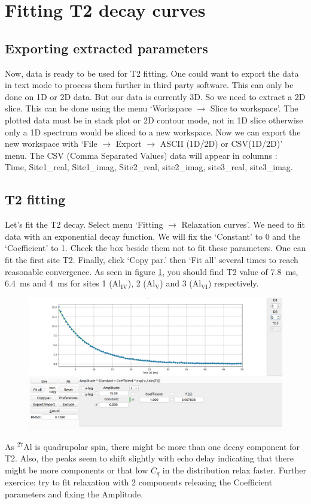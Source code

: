\documentclass[11pt,a4paper]{article}
\begin{document}
\section{Fitting T2 decay curves }
\subsection{Exporting extracted parameters}
Now, data is ready to be used for T2 fitting. One could want to export the data in text mode to process them further in third party software.
This can only be done on 1D or 2D data. But our data is currently 3D. So we need to extract a 2D slice. This can be done using the menu 
`Workspace  $\rightarrow$ Slice to workspace'. The plotted data must be in stack plot or 2D contour mode, not in 1D slice 
otherwise only a 1D spectrum would be sliced to a new workspace. Now we can export the new workspace with 
`File $\rightarrow$ Export $\rightarrow$ ASCII (1D/2D) or CSV(1D/2D)' menu. The CSV (Comma Separated Values) data will appear in columns :\\
Time, Site1\_real, Site1\_imag, Site2\_real, site2\_imag, site3\_real, site3\_imag.

\subsection{T2 fitting}
Let's fit the T2 decay. Select menu `Fitting $\rightarrow$ Relaxation curves'.
We need to fit data with an exponential decay function. We will fix the `Constant' to 0  and the `Coefficient' to 1. Check the box beside them not to fit these parameters.
One can fit the first site T2. Finally, click `Copy par.' then `Fit all' several times to reach reasonable convergence.
As seen in figure \ref{fig:FinalFit_relax}, you should find T2 value of 7.8~ms, 6.4~ms and 4~ms for sites 1 ($\mathrm{Al_{IV}}$), 2 ($\mathrm{Al_{V}}$) and 3 
($\mathrm{Al_{VI}}$) respectively.

\begin{figure}[h!]
\includegraphics[width=0.8\linewidth]{Figs/FinalFit_relax.png}
\caption{}
\label{fig:FinalFit_relax}
\end{figure}

As $\mathrm{{}^{27}Al}$ is quadrupolar spin, there might be more than one decay component for T2. Also, the peaks seem to shift slightly with echo delay
indicating that there might be more components or that low $C_q$ in the distribution relax faster.
Further exercice: try to fit relaxation with 2 components releasing the Coefficient parameters and fixing the Amplitude.
\end{document}
